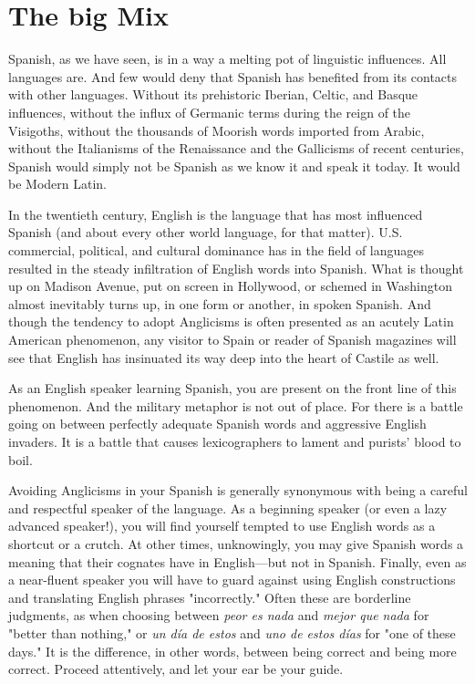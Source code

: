 \chapter{The big Mix}

Spanish, as we have seen, is in a way a melting pot of linguistic influences. All languages are. And few would deny that Spanish has
benefited from its contacts with other languages. Without its prehistoric Iberian, Celtic, and Basque influences, without the influx of Germanic terms during the reign of the Visigoths, without the thousands
of Moorish words imported from Arabic, without the Italianisms of
the Renaissance and the Gallicisms of recent centuries, Spanish would
simply not be Spanish as we know it and speak it today. It would be
Modern Latin.

In the twentieth century, English is the language that has most
influenced Spanish (and about every other world language, for that matter). U.S. commercial, political, and cultural dominance has in the field
of languages resulted in the steady infiltration of English words into
Spanish. What is thought up on Madison Avenue, put on screen in
Hollywood, or schemed in Washington almost inevitably turns up, in
one form or another, in spoken Spanish. And though the tendency to
adopt Anglicisms is often presented as an acutely Latin American phenomenon, any visitor to Spain or reader of Spanish magazines will see
that English has insinuated its way deep into the heart of Castile
as well.

As an English speaker learning Spanish, you are present on the
front line of this phenomenon. And the military metaphor is not out of
place. For there is a battle going on between perfectly adequate Spanish
words and aggressive English invaders. It is a battle that causes lexicographers to lament and purists' blood to boil.

Avoiding Anglicisms in your Spanish is generally synonymous
with being a careful and respectful speaker of the language. As a beginning speaker (or even a lazy advanced speaker!), you will find yourself
tempted to use English words as a shortcut or a crutch. At other times,
unknowingly, you may give Spanish words a meaning that their cognates have in English---but not in Spanish. Finally, even as a near-fluent speaker you will have to guard against using English constructions and translating English phrases "incorrectly." Often these are
borderline judgments, as when choosing between \emph{peor es nada} and
\emph{mejor que nada} for "better than nothing," or \emph{un día de estos} and
\emph{uno de estos días} for "one of these days." It is the difference, in other
words, between being correct and being more correct. Proceed attentively, and let your ear be your guide.

